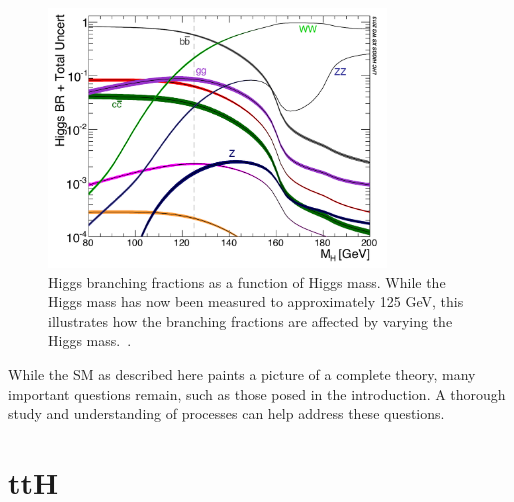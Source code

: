 \begin{figure}[hbtp]
 \begin{center}
   \includegraphics[width=0.8\textwidth]{ch2_figs/higgs_decay.pdf}
   \caption[Higgs branching fractions vs mass]{Higgs branching fractions as a function of Higgs mass. While the Higgs mass has now been measured
     to approximately 125 GeV, this illustrates how the branching fractions are affected by varying the Higgs mass.~\cite{lhchxswg}.}
   \label{fig:higgs_decay}
 \end{center}
\end{figure}

While the SM as described here paints a picture of a complete theory, many important questions remain, such as those posed in the introduction.
A thorough study and understanding of \tth processes can help address these questions.  

\section{ttH}
\label{sec:tth}
